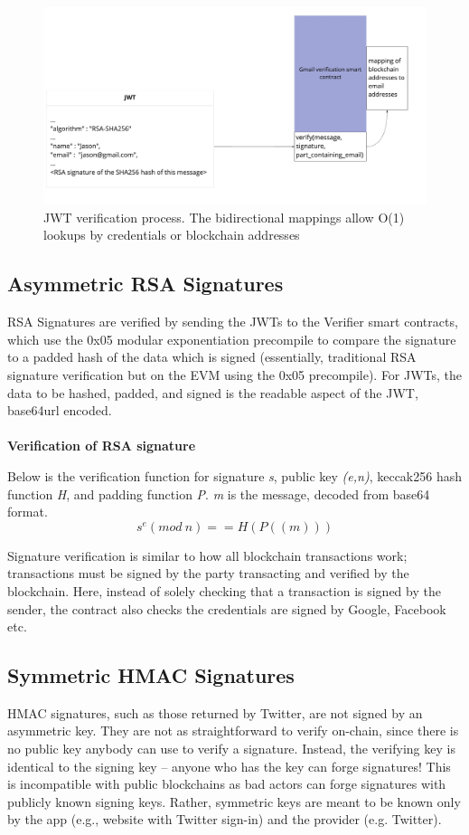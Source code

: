 \documentclass[11pt,oneside,a4paper]{article}
\begin{document}
		\begin{figure}[h!]
        \includegraphics[width=\linewidth]{onChainJWT.jpeg}
        \caption{JWT verification process. The bidirectional mappings  allow O(1) lookups by credentials or blockchain addresses}
        \label{fig:jwtVerification}
        \end{figure}
		
		\pagebreak

		\subsection*{Asymmetric RSA Signatures}
		RSA Signatures are verified by sending the JWTs to the Verifier smart contracts, which use the 0x05 modular exponentiation precompile to compare the signature to a padded hash of the data which is signed (essentially, traditional RSA signature verification but on the EVM using the 0x05 precompile). For JWTs, the data to be hashed, padded, and signed is the readable aspect of the JWT, base64url encoded.
\\
\\
		\textbf{Verification of RSA signature}
		
		Below is the verification function for signature \textit{s}, public key \textit{(e,n)}, keccak256 hash function \textit{H}, and padding function \textit{P}. \textit{m} is the message, decoded from base64 format.
		\[ s^e (mod\ n)  == H(P((m))) \]
		
		Signature verification is similar to how all blockchain transactions work; transactions must be signed by the party transacting and verified by the blockchain. Here, instead of solely checking that a transaction is signed by the sender, the contract also checks the credentials are signed by Google, Facebook etc. 
		
	    \subsection*{Symmetric HMAC Signatures}
			HMAC signatures, such as those returned by Twitter, are not signed by an asymmetric key. They are not as straightforward to verify on-chain, since there is no public key anybody can use to verify a signature. Instead, the verifying key is identical to the signing key -- anyone who has the key can forge signatures! This is incompatible with public blockchains as bad actors can forge signatures with publicly known signing keys. Rather, symmetric keys are meant to be known only by the app (e.g., website with Twitter sign-in) and the provider (e.g. Twitter). 
			
\end{document}
